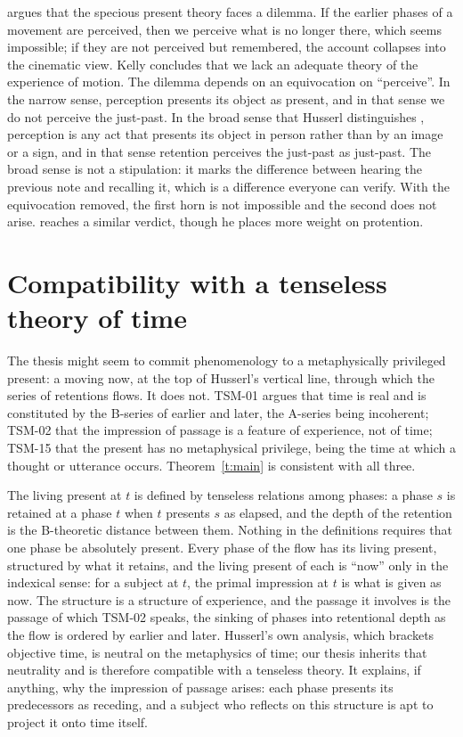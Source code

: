 \documentclass{situationist-preprint}
\begin{document}
\citet{Kelly2005} argues that the specious present theory faces a dilemma. If the earlier phases of a movement are perceived, then we perceive what is no longer there, which seems impossible; if they are not perceived but remembered, the account collapses into the cinematic view. Kelly concludes that we lack an adequate theory of the experience of motion. The dilemma depends on an equivocation on \enquote{perceive}. In the narrow sense, perception presents its object as present, and in that sense we do not perceive the just-past. In the broad sense that Husserl distinguishes \citep[\S 17]{Husserl1966}, perception is any act that presents its object in person rather than by an image or a sign, and in that sense retention perceives the just-past as just-past. The broad sense is not a stipulation: it marks the difference between hearing the previous note and recalling it, which is a difference everyone can verify. With the equivocation removed, the first horn is not impossible and the second does not arise. \citet{Gallagher1998} reaches a similar verdict, though he places more weight on protention.

\section{Compatibility with a tenseless theory of time}\label{s:btheory}

The thesis might seem to commit phenomenology to a metaphysically privileged present: a moving now, at the top of Husserl's vertical line, through which the series of retentions flows. It does not. TSM-01 argues that time is real and is constituted by the B-series of earlier and later, the A-series being incoherent; TSM-02 that the impression of passage is a feature of experience, not of time; TSM-15 that the present has no metaphysical privilege, being the time at which a thought or utterance occurs. Theorem~\ref{t:main} is consistent with all three.

The living present at $t$ is defined by tenseless relations among phases: a phase $s$ is retained at a phase $t$ when $t$ presents $s$ as elapsed, and the depth of the retention is the B-theoretic distance between them. Nothing in the definitions requires that one phase be absolutely present. Every phase of the flow has its living present, structured by what it retains, and the living present of each is \enquote{now} only in the indexical sense: for a subject at $t$, the primal impression at $t$ is what is given as now. The structure is a structure of experience, and the passage it involves is the passage of which TSM-02 speaks, the sinking of phases into retentional depth as the flow is ordered by earlier and later. Husserl's own analysis, which brackets objective time, is neutral on the metaphysics of time; our thesis inherits that neutrality and is therefore compatible with a tenseless theory. It explains, if anything, why the impression of passage arises: each phase presents its predecessors as receding, and a subject who reflects on this structure is apt to project it onto time itself.
\end{document}
